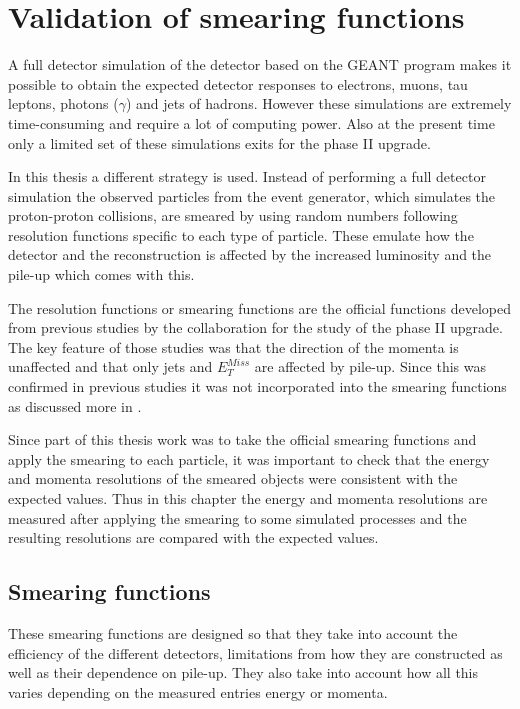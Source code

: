 \chapter{Validation of smearing functions}\label{cha:vali}
A full detector simulation of the \abbrATLAS detector based on the GEANT \citep{Geant4} program makes it possible to obtain the expected detector responses to electrons, muons, tau leptons, photons ($\gamma$) and jets of hadrons. However these simulations are extremely time-consuming and require a lot of computing power. Also at the present time only a limited set of these simulations exits for the \abbrATLAS phase II upgrade.

In this thesis a different strategy is used. Instead of performing a full detector simulation the observed particles from the event generator, which simulates the proton-proton collisions, are smeared by using random numbers following resolution functions specific to each type of particle. These emulate how the detector and the reconstruction is affected by the increased luminosity and the pile-up which comes with this. 

The resolution functions or smearing functions are the official functions developed from previous studies \citep{ATLAS:LOI2, ATL-PHYS-PUB-2013-004} by the \abbrATLAS collaboration for the study of the \abbrATLAS phase II upgrade. The key feature of those studies was that the direction of the momenta is unaffected and that only jets and $E^{Miss}_T$ are affected by pile-up. Since this was confirmed in previous studies it was not incorporated into the smearing functions as discussed more in .

Since part of this thesis work was to take the official \abbrATLAS smearing functions and apply the smearing to each particle, it was important to check that the energy and momenta resolutions of the smeared objects were consistent with the expected values. Thus in this chapter the energy and momenta resolutions are measured after applying the smearing to some simulated processes and the resulting resolutions are compared with the expected values.

\newpage
\section{Smearing functions}\label{sec:smear}
These smearing functions are designed so that they take into account the efficiency of the different detectors, limitations from how they are constructed as well as their dependence on pile-up. They also take into account how all this varies depending on the measured entries energy or momenta.

